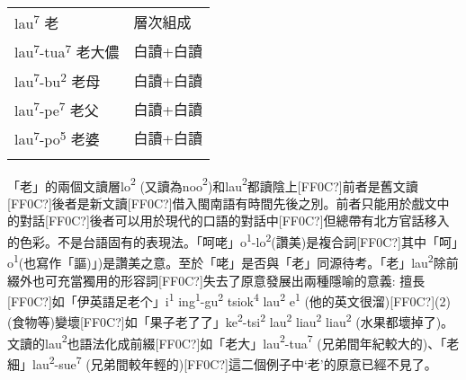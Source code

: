 \tabletail{}
\tablelasttail{}
\begin{tabularx}{\textwidth}{XX}
\lsptoprule

{\sffamily \textrm{lau}\textrm{\textsuperscript{7}} \textrm{老}} & 層次組成\\
{\sffamily \textrm{lau}\textrm{\textsuperscript{7}}\textrm{{}-tua}\textrm{\textsuperscript{7}} \textrm{老大儂}} & 白讀+白讀\\
{\sffamily \textrm{lau}\textrm{\textsuperscript{7}}\textrm{{}-bu}\textrm{\textsuperscript{2}} \textrm{老母}} & 白讀+白讀\\
{\sffamily \textrm{lau}\textrm{\textsuperscript{7}}\textrm{{}-pe}\textrm{\textsuperscript{7}} \textrm{老父}} & 白讀+白讀\\
{\sffamily \textrm{lau}\textrm{\textsuperscript{7}}\textrm{{}-po}\textrm{\textsuperscript{5}} \textrm{老婆}} & 白讀+白讀\\
\lspbottomrule
\end{tabularx}
\textrm{「老」的兩個文讀層lo}\textrm{\textsuperscript{2}} \textrm{(又讀為noo}\textrm{\textsuperscript{2}}\textrm{)和lau}\textrm{\textsuperscript{2}}\textrm{都讀陰上[FF0C?]前者是舊文讀[FF0C?]後者是新文讀[FF0C?]借入閩南語有時間先後之別。前者只能用於戲文中的對話[FF0C?]後者可以用於現代的口語的對話中[FF0C?]但總帶有北方官話移入的色彩。不是台語固有的表現法。「呵咾」o}\textrm{\textsuperscript{1}}\textrm{{}-lo}\textrm{\textsuperscript{2}}\textrm{(讚美)是複合詞[FF0C?]其中「呵」o}\textrm{\textsuperscript{1}}\textrm{(也寫作「謳)」)是讚美之意。至於「咾」是否與「老」同源待考。「老」lau}\textrm{\textsuperscript{2}}\textrm{除前綴外也可充當獨用的形容詞[FF0C?]失去了原意發展出兩種隱喻的意義: 擅長[FF0C?]如「伊英語足老个」i}\textrm{\textsuperscript{1}} \textrm{ing}\textrm{\textsuperscript{1}}\textrm{{}-gu}\textrm{\textsuperscript{2}} \textrm{tsiok}\textrm{\textsuperscript{4}} \textrm{lau}\textrm{\textsuperscript{2}} \textrm{e}\textrm{\textsuperscript{1}} \textrm{(他的英文很溜)}[FF0C?]\textrm{(2) (食物等)變壞[FF0C?]如「果子老了了」ke}\textrm{\textsuperscript{2}}\textrm{{}-tsi}\textrm{\textsuperscript{2}} \textrm{lau}\textrm{\textsuperscript{2}} \textrm{liau}\textrm{\textsuperscript{2}} \textrm{liau}\textrm{\textsuperscript{2}} \textrm{(水果都壞掉了)}。\textrm{文讀的lau}\textrm{\textsuperscript{2}}\textrm{也語法化成前綴[FF0C?]如「老大」lau}\textrm{\textsuperscript{2}}\textrm{{}-tua}\textrm{\textsuperscript{7}} \textrm{(兄弟間年紀較大的)}、\textrm{「老細」lau}\textrm{\textsuperscript{2}}\textrm{{}-sue}\textrm{\textsuperscript{7}} \textrm{(兄弟間較年輕的)[FF0C?]這二個例子中‘老’的原意已經不見了。}

